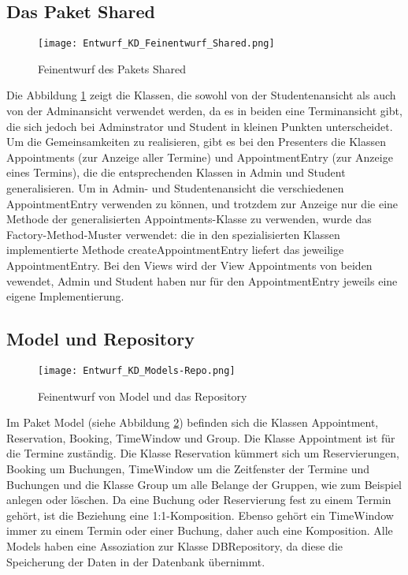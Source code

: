  \subsection{Das Paket Shared}
 \begin{figure}
  \texttt{[image: Entwurf\_KD\_Feinentwurf\_Shared.png]}
  \label{fig:Klassendiagramm_Shared}
  \caption{Feinentwurf des Pakets Shared}
 \end{figure}

 Die Abbildung \ref{fig:Klassendiagramm_Shared} zeigt die Klassen, die sowohl von der Studentenansicht als auch von der Adminansicht verwendet werden, da es in beiden eine Terminansicht gibt, die sich jedoch bei Adminstrator und Student in kleinen Punkten unterscheidet.
 Um die Gemeinsamkeiten zu realisieren, gibt es bei den Presenters die Klassen Appointments (zur Anzeige aller Termine) und AppointmentEntry (zur Anzeige eines Termins), die die entsprechenden Klassen in Admin und Student generalisieren.
 Um in Admin- und Studentenansicht die verschiedenen AppointmentEntry verwenden zu können, und trotzdem zur Anzeige nur die eine Methode der generalisierten Appointments-Klasse zu verwenden, wurde das Factory-Method-Muster verwendet: die in den spezialisierten Klassen implementierte Methode createAppointmentEntry liefert das jeweilige AppointmentEntry.
 Bei den Views wird der View Appointments von beiden vewendet, Admin und Student haben nur für den AppointmentEntry jeweils eine eigene Implementierung.

 \subsection{Model und Repository}
 \begin{figure}
  \texttt{[image: Entwurf\_KD\_Models-Repo.png]}
  \label{fig:Klassendiagramm_Models-Repo}
\caption{Feinentwurf von Model und das Repository}
 \end{figure}

Im Paket Model (siehe Abbildung \ref{fig:Klassendiagramm_Models-Repo}) befinden sich die Klassen Appointment, Reservation, Booking, TimeWindow und Group. Die Klasse Appointment ist für die Termine zuständig. Die Klasse Reservation kümmert sich um Reservierungen, Booking um Buchungen, TimeWindow um die Zeitfenster der Termine und Buchungen und die Klasse Group um alle Belange der Gruppen, wie zum Beispiel anlegen oder löschen.
Da eine Buchung oder Reservierung fest zu einem Termin gehört, ist die Beziehung eine 1:1-Komposition. Ebenso gehört ein TimeWindow immer zu einem Termin oder einer Buchung, daher auch eine Komposition.
Alle Models haben eine Assoziation zur Klasse DBRepository, da diese die Speicherung der Daten in der Datenbank übernimmt.
\\

